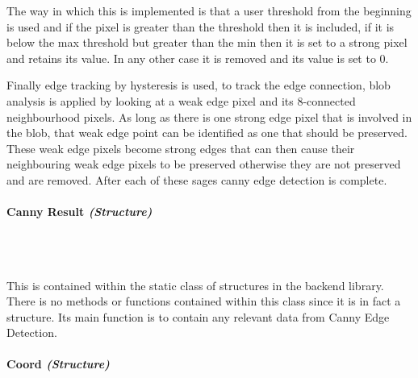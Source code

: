 \begin{FlushLeft}
    The way in which this is implemented is that a user threshold from the beginning is used and if the pixel is greater than the threshold then it is included, if it is below the max threshold but greater than the min then it is set to a strong pixel and retains its value. In any other case it is removed and its value is set to 0. \\ \bk

    Finally edge tracking by hysteresis is used, to track the edge connection, blob analysis is applied by looking at a weak edge pixel and its 8-connected neighbourhood pixels. As long as there is one strong edge pixel that is involved in the blob, that weak edge point can be identified as one that should be preserved. These weak edge pixels become strong edges that can then cause their neighbouring weak edge pixels to be preserved otherwise they are not preserved and are removed. After each of these sages canny edge detection is complete. \\ \bk    
    \bk


    \paragraph*{Canny Result \textit{(Structure)}} \mbox{} \\

    \begin{figure}[H]
        \centering
    \end{figure}\\

    This is contained within the static class of structures in the backend library. There is no methods or functions contained within this class since it is in fact a structure. Its main function is to contain any relevant data from Canny Edge Detection.

    \bk

    \paragraph*{Coord \textit{(Structure)}} \mbox{} \\


\end{FlushLeft}
